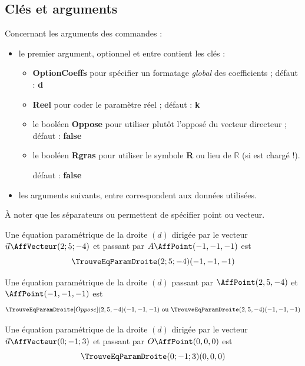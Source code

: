 \documentclass[a4paper,french,11pt]{article}
\newcommand\ctex[1]{\tcbox[vignettelatex]{#1}}
\newcommand\Cle[1]{{\bfseries\sffamily\textlangle \textcolor{orange!75!black}{#1}\textrangle}}
\begin{document}
\subsection{Clés et arguments}

\begin{cautionblock}
Concernant les arguments des commandes :

\begin{itemize}
	\item le premier argument, optionnel et entre \ctex{[...]}  contient les clés :
	\begin{itemize}
		\item \Cle{OptionCoeffs} pour spécifier un formatage \textit{global} des coefficients ; \hfill{}défaut : \Cle{d}
		\item \Cle{Reel} pour coder le paramètre réel ; \hfill{}défaut : \Cle{k}
		\item le booléen \Cle{Oppose} pour utiliser plutôt l'opposé du vecteur directeur ; \hfill{}défaut : \Cle{false}
		\item le booléen \Cle{Rgras} pour utiliser le symbole \textbf{R} ou lieu de $\mathbb{R}$ (si \ctex{amsfonts} est chargé !).
		
		\hfill{}défaut : \Cle{false}
	\end{itemize}
	\item les arguments suivants, entre \ctex{(...)} correspondent aux données utilisées.
\end{itemize}

À noter que les séparateurs \ctex{,} ou \ctex{;} permettent de spécifier point ou vecteur.
\end{cautionblock}

\begin{PresCodePL}{}
Une équation paramétrique de la droite $(d)$ dirigée par le vecteur $\vec{u}\AffVecteur(2;5;-4)$ et passant par $A\AffPoint(-1,-1,-1)$ est
\[ \TrouveEqParamDroite(2;5;-4)(-1,-1,-1) \]
\end{PresCodePL}

\begin{PresCodePL}{}
Une équation paramétrique de la droite $(d)$ passant par $\AffPoint(2,5,-4)$ et $\AffPoint(-1,-1,-1)$ est
\[ \TrouveEqParamDroite[Oppose](2,5,-4)(-1,-1,-1) \text{ ou } \TrouveEqParamDroite(2,5,-4)(-1,-1,-1) \]
\end{PresCodePL}

\begin{PresCodePL}{}
Une équation paramétrique de la droite $(d)$ dirigée par le vecteur $\vec{u}\AffVecteur(0;-1;3)$ et passant par $O\AffPoint(0,0,0)$ est
\[ \TrouveEqParamDroite(0;-1;3)(0,0,0) \]
\end{PresCodePL}
\end{document}
